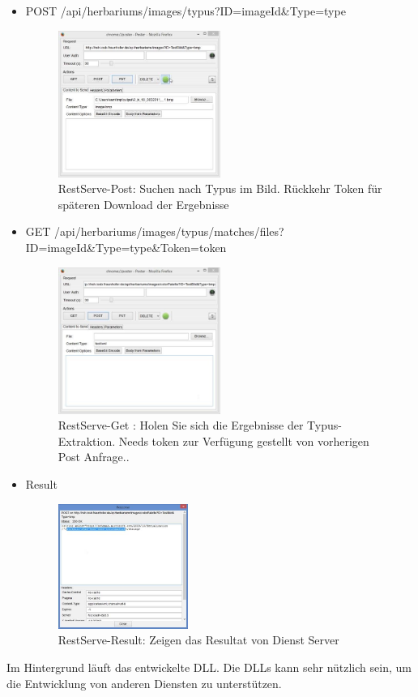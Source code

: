 \documentclass[10pt,a4paper]{report}
\begin{document}
\begin{itemize}
\item POST /api/herbariums/images/typus?ID={imageId}\&Type={type}\\
\begin{figure}[htbp] 
	\centering
	\includegraphics[width=0.5\textwidth]{RestServe1.jpg}
	\caption{RestServe-Post: Suchen nach Typus im Bild. Rückkehr Token für späteren Download der Ergebnisse}
	\label{fig:Bild 3.3}
\end{figure}
\item GET /api/herbariums/images/typus/matches/files?ID={imageId}\&Type={type}\&Token={token}
\begin{figure}[htbp] 
	\centering
	\includegraphics[width=0.5\textwidth]{Server2.jpg}
	\caption{RestServe-Get :
	Holen Sie sich die Ergebnisse der Typus-Extraktion. Needs token zur Verfügung gestellt von vorherigen Post Anfrage..}
	\label{fig:Bild 3.4}
\end{figure}
\item Result \\
\begin{figure}[htbp] 
	\centering
	\includegraphics[width=0.4\textwidth]{Server3.jpg}
	\caption{RestServe-Result: Zeigen das Resultat von Dienst Server}
	\label{fig:Bild 3.5}
\end{figure}
\end{itemize}
Im Hintergrund läuft das entwickelte DLL. Die DLLs kann sehr nützlich sein, um die Entwicklung von anderen Diensten zu unterstützen.
\end{document}
